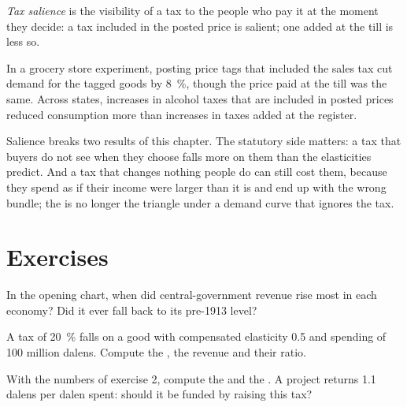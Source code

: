 \begin{definition}\label{def:b3:efficiency-cost-of-taxation:salience}
\emph{Tax salience} is the visibility of a tax to the people who pay it at the moment
they decide: a tax included in the posted price is salient; one added at the till
is less so.
\end{definition}

\begin{record}
In a grocery store experiment, posting price tags that included the sales tax cut
demand for the tagged goods by 8~\%, though the price paid at the till was the same.
Across states, increases in alcohol taxes that are included in posted prices
reduced consumption more than increases in taxes added at the register.
\end{record}

Salience breaks two results of this chapter. The statutory side matters: a tax that
buyers do not see when they choose falls more on them than the elasticities
predict. And a tax that changes nothing people do can still cost them, because they
spend as if their income were larger than it is and end up with the wrong bundle;
the  is no longer the triangle under a demand curve that ignores the
tax.

\section{Exercises}\label{sec:b3:efficiency-cost-of-taxation:exercises}

\begin{exercise}[$\star$]\label{exo:b3:efficiency-cost-of-taxation:1}
In the opening chart, when did central-government revenue rise most in each
economy? Did it ever fall back to its pre-1913 level?
\end{exercise}

\begin{exercise}[$\star$]\label{exo:b3:efficiency-cost-of-taxation:2}
A tax of 20~\% falls on a good with compensated elasticity 0.5 and spending of 100
million dalens. Compute the , the revenue and their ratio.
\end{exercise}

\begin{exercise}[$\star$]\label{exo:b3:efficiency-cost-of-taxation:3}
With the numbers of exercise 2, compute the  and the . A project returns 1.1 dalens per dalen spent: should it be
funded by raising this tax?
\end{exercise}

